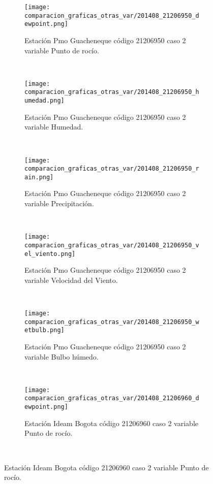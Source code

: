 \begin{figure}[H]
\centering
\begin{subfigure}[normla]{0.4\textwidth}
\caption{Estación Pmo Guacheneque código 21206950 caso 2 variable Punto de rocío.}
\texttt{[image: comparacion\_graficas\_otras\_var/201408\_21206950\_dewpoint.png]}
\end{subfigure}
~
\begin{subfigure}[normla]{0.4\textwidth}
\caption{Estación Pmo Guacheneque código 21206950 caso 2 variable Humedad.}
\texttt{[image: comparacion\_graficas\_otras\_var/201408\_21206950\_humedad.png]}
\end{subfigure}
~
\begin{subfigure}[normla]{0.4\textwidth}
\caption{Estación Pmo Guacheneque código 21206950 caso 2 variable Precipitación.}
\texttt{[image: comparacion\_graficas\_otras\_var/201408\_21206950\_rain.png]}
\end{subfigure}
~
\begin{subfigure}[normla]{0.4\textwidth}
\caption{Estación Pmo Guacheneque código 21206950 caso 2 variable Velocidad del Viento.}
\texttt{[image: comparacion\_graficas\_otras\_var/201408\_21206950\_vel\_viento.png]}
\end{subfigure}
~
\begin{subfigure}[normla]{0.4\textwidth}
\caption{Estación Pmo Guacheneque código 21206950 caso 2 variable Bulbo húmedo.}
\texttt{[image: comparacion\_graficas\_otras\_var/201408\_21206950\_wetbulb.png]}
\end{subfigure}
~
\begin{subfigure}[normla]{0.4\textwidth}
\caption{Estación Ideam Bogota código 21206960 caso 2 variable Punto de rocío.}
\texttt{[image: comparacion\_graficas\_otras\_var/201408\_21206960\_dewpoint.png]}
\end{subfigure}
~
\end{figure}
           
